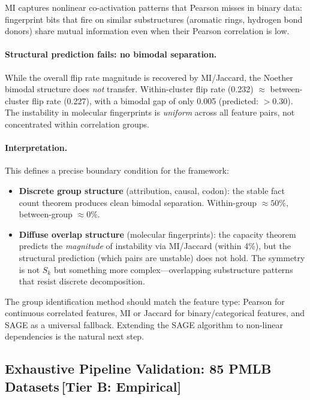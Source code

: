 \documentclass[11pt,a4paper]{article}
\begin{document}
MI captures nonlinear co-activation patterns that Pearson misses in binary data: fingerprint bits that fire on similar substructures (aromatic rings, hydrogen bond donors) share mutual information even when their Pearson correlation is low.

\paragraph{Structural prediction fails: no bimodal separation.}
While the overall flip rate magnitude is recovered by MI/Jaccard, the Noether bimodal structure does \emph{not} transfer. Within-cluster flip rate (0.232) $\approx$ between-cluster flip rate (0.227), with a bimodal gap of only 0.005 (predicted: $> 0.30$). The instability in molecular fingerprints is \emph{uniform} across all feature pairs, not concentrated within correlation groups.

\paragraph{Interpretation.}
This defines a precise boundary condition for the framework:
\begin{itemize}
  \item \textbf{Discrete group structure} (attribution, causal, codon): the stable fact count theorem produces clean bimodal separation. Within-group $\approx 50\%$, between-group $\approx 0\%$.
  \item \textbf{Diffuse overlap structure} (molecular fingerprints): the capacity theorem predicts the \emph{magnitude} of instability via MI/Jaccard (within 4\%), but the structural prediction (which pairs are unstable) does not hold. The symmetry is not $S_k$ but something more complex---overlapping substructure patterns that resist discrete decomposition.
\end{itemize}

The group identification method should match the feature type: Pearson for continuous correlated features, MI or Jaccard for binary/categorical features, and SAGE as a universal fallback. Extending the SAGE algorithm to non-linear dependencies is the natural next step.

\subsection{Exhaustive Pipeline Validation: 85 PMLB Datasets\,\textnormal{\normalsize[Tier B: Empirical]}}
\label{sec:massive-validation}
\end{document}
